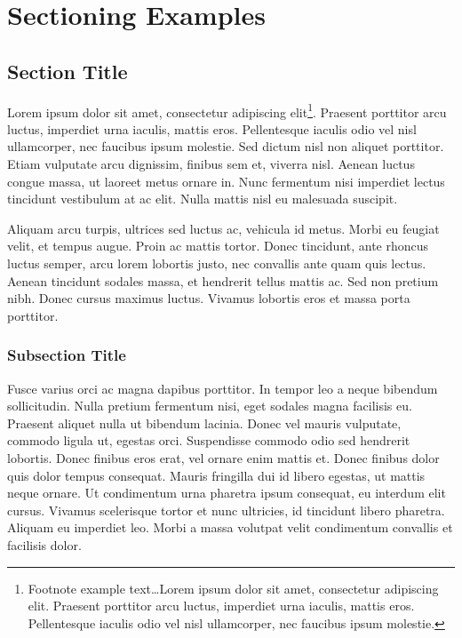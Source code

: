 \documentclass[
	11pt,
	fleqn,
	a4paper,
]{LegrandOrangeBook}
\begin{document}
\chapterspaceabove{6.75cm} %
\chapterspacebelow{7.25cm} %


\chapter{Sectioning Examples}

\section{Section Title}

Lorem ipsum dolor sit amet, consectetur adipiscing elit\footnote{Footnote example text\ldots Lorem ipsum dolor sit amet, consectetur adipiscing elit. Praesent porttitor arcu luctus, imperdiet urna iaculis, mattis eros. Pellentesque iaculis odio vel nisl ullamcorper, nec faucibus ipsum molestie.}. Praesent porttitor arcu luctus, imperdiet urna iaculis, mattis eros. Pellentesque iaculis odio vel nisl ullamcorper, nec faucibus ipsum molestie. Sed dictum nisl non aliquet porttitor. Etiam vulputate arcu dignissim, finibus sem et, viverra nisl. Aenean luctus congue massa, ut laoreet metus ornare in. Nunc fermentum nisi imperdiet lectus tincidunt vestibulum at ac elit. Nulla mattis nisl eu malesuada suscipit.

Aliquam arcu turpis, ultrices sed luctus ac, vehicula id metus. Morbi eu feugiat velit, et tempus augue. Proin ac mattis tortor. Donec tincidunt, ante rhoncus luctus semper, arcu lorem lobortis justo, nec convallis ante quam quis lectus. Aenean tincidunt sodales massa, et hendrerit tellus mattis ac. Sed non pretium nibh. Donec cursus maximus luctus. Vivamus lobortis eros et massa porta porttitor.

\subsection{Subsection Title}

Fusce varius orci ac magna dapibus porttitor. In tempor leo a neque bibendum sollicitudin. Nulla pretium fermentum nisi, eget sodales magna facilisis eu. Praesent aliquet nulla ut bibendum lacinia. Donec vel mauris vulputate, commodo ligula ut, egestas orci. Suspendisse commodo odio sed hendrerit lobortis. Donec finibus eros erat, vel ornare enim mattis et. Donec finibus dolor quis dolor tempus consequat. Mauris fringilla dui id libero egestas, ut mattis neque ornare. Ut condimentum urna pharetra ipsum consequat, eu interdum elit cursus. Vivamus scelerisque tortor et nunc ultricies, id tincidunt libero pharetra. Aliquam eu imperdiet leo. Morbi a massa volutpat velit condimentum convallis et facilisis dolor.
\end{document}
